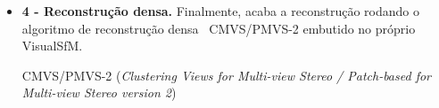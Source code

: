 \begin{itemize}



\item \textbf{4 - Reconstrução densa.} Finalmente, acaba a reconstrução rodando o algoritmo de reconstrução densa~\cite{gavadense} CMVS/PMVS-2 embutido no próprio VisualSfM.

CMVS/PMVS-2 (\emph{Clustering Views for Multi-view Stereo / Patch-based for Multi-view Stereo version 2})



\end{itemize}

